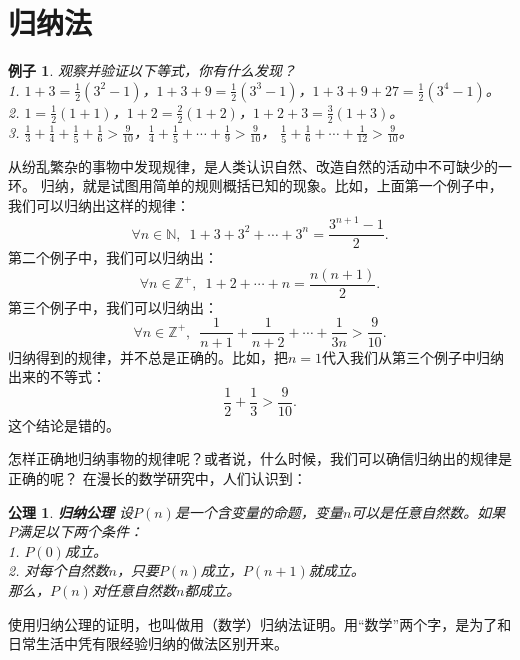 \documentclass[12pt,UTF8]{ctexbook}
\newtheorem{ex}{例子}[section]
\newtheorem{po}{公理}
\begin{document}
\section{归纳法}
\begin{ex}\label{ex:2-2-0}
    观察并验证以下等式，你有什么发现？\\
    1. $1 + 3 = \frac12(3^2 - 1)$，$1 + 3 + 9 = \frac12(3^3 - 1)$，$1 + 3 + 9 + 27 = \frac12(3^4 - 1)$。\\
    2. $1 = \frac12(1+1)$，$1 + 2 = \frac22(1 + 2)$，$1 + 2 + 3 = \frac32(1 + 3)$。\\
    3. $\frac13 + \frac14 + \frac15 + \frac16 > \frac{9}{10}$，$\frac14 + \frac15 + \cdots + \frac{1}{9} > \frac{9}{10}$，
    $\frac15 + \frac16 + \cdots + \frac{1}{12} > \frac{9}{10}$。    
\end{ex}
从纷乱繁杂的事物中发现规律，是人类认识自然、改造自然的活动中不可缺少的一环。
归纳，就是试图用简单的规则概括已知的现象。比如，上面第一个例子中，我们可以归纳出这样的规律：
$$ \forall n \in \mathbb{N}, \,\,\, 1 + 3 + 3^2 + \cdots + 3^n = \frac{3^{n+1} - 1}{2}. $$
第二个例子中，我们可以归纳出：
$$ \forall n \in \mathbb{Z}^+, \,\,\, 1 + 2 + \cdots + n = \frac{n(n+1)}{2}. $$
第三个例子中，我们可以归纳出：
$$ \forall n \in \mathbb{Z}^+, \,\,\, \frac{1}{n+1} + \frac{1}{n+2} + \cdots + \frac{1}{3n} > \frac{9}{10}. $$
归纳得到的规律，并不总是正确的。比如，把$n=1$代入我们从第三个例子中归纳出来的不等式：
$$ \frac12 + \frac13 > \frac{9}{10}.$$
这个结论是错的。

怎样正确地归纳事物的规律呢？或者说，什么时候，我们可以确信归纳出的规律是正确的呢？
在漫长的数学研究中，人们认识到：
\begin{po}{\textbf{归纳公理}}
    设$P(n)$是一个含变量的命题，变量$n$可以是任意自然数。如果$P$满足以下两个条件：\\
    1. $P(0)$成立。\\
    2. 对每个自然数$n$，只要$P(n)$成立，$P(n+1)$就成立。\\
    那么，$P(n)$对任意自然数$n$都成立。
\end{po}
使用归纳公理的证明，也叫做用（数学）归纳法证明。用“数学”两个字，是为了和日常生活中凭有限经验归纳的做法区别开来。
\end{document}
